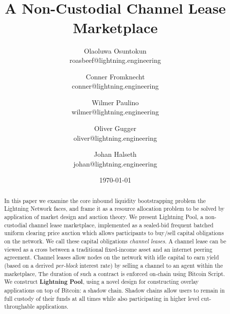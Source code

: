 \documentclass[12pt,a4paper]{article}
\theoremstyle{definition}
\begin{document}
\title{\texttt{} \\
    A Non-Custodial Channel Lease Marketplace}
\author{
    Olaoluwa Osuntokun \\ 
    \small{roasbeef@lightning.engineering}
    \and
    Conner Fromknecht \\
    \small{conner@lightning.engineering}
     \and
     Wilmer Paulino  \\
    \small{wilmer@lightning.engineering}
     \and
     Oliver Gugger \\
    \small{oliver@lightning.engineering}
     \and
     Johan Halseth \\
    \small{johan@lightning.engineering}
}

\date{\today}
\maketitle

\begin{abstract}


In this paper we examine the core inbound liquidity bootstrapping problem the
Lightning Network faces, and frame it as a resource allocation problem to be
solved by application of market design and auction theory. We present Lightning
Pool, a non-custodial channel lease marketplace, implemented as a sealed-bid
frequent batched uniform clearing price auction which allows participants to
buy/sell capital obligations on the network. We call these capital obligations
\emph{channel leases}. A channel lease can be viewed as a cross between a
traditional fixed-income asset and an internet peering agreement. Channel
leases allow nodes on the network with idle capital to earn yield (based on a
derived \emph{per-block} interest rate) by selling a channel to an agent within
the marketplace, The duration of such a contract is enforced on-chain using
Bitcoin Script. We construct \textbf{Lightning Pool}, using a novel design for
constructing overlay applications on top of Bitcoin: a shadow chain. Shadow
chains allow users to remain in full custody of their funds at all times while
also participating in higher level cut-throughable applications. 

\end{abstract}
\end{document}
